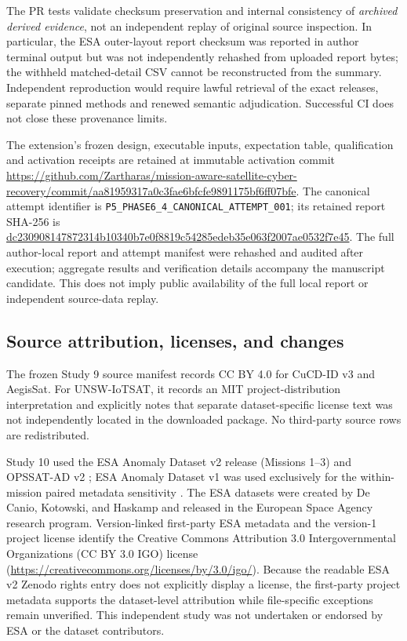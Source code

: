\documentclass[preprint,12pt]{elsarticle}
\begin{document}
The PR tests validate checksum preservation and internal consistency of \emph{archived derived evidence}, not an independent replay of original source inspection. In particular, the ESA outer-layout report checksum was reported in author terminal output but was not independently rehashed from uploaded report bytes; the withheld matched-detail CSV cannot be reconstructed from the summary. Independent reproduction would require lawful retrieval of the exact releases, separate pinned methods and renewed semantic adjudication. Successful CI does not close these provenance limits.

The extension's frozen design, executable inputs, expectation table, qualification and activation receipts are retained at immutable activation commit \url{https://github.com/Zartharas/mission-aware-satellite-cyber-recovery/commit/aa81959317a0c3fae6bfcfe9891175bf6ff07bfe}. The canonical attempt identifier is \texttt{P5\_PHASE6\_4\_CANONICAL\_ATTEMPT\_001}; its retained report SHA-256 is \url{dc230908147872314b10340b7e0f8819c54285edeb35e063f2007ae0532f7e45}. The full author-local report and attempt manifest were rehashed and audited after execution; aggregate results and verification details accompany the manuscript candidate. This does not imply public availability of the full local report or independent source-data replay.

\subsection{Source attribution, licenses, and changes}
The frozen Study 9 source manifest records CC BY 4.0 for CuCD-ID v3 and AegisSat. For UNSW-IoTSAT, it records an MIT project-distribution interpretation and explicitly notes that separate dataset-specific license text was not independently located in the downloaded package. No third-party source rows are redistributed.

Study 10 used the ESA Anomaly Dataset v2 release (Missions 1--3) \cite{esaad2025v2} and OPSSAT-AD v2 \cite{opssat2024v2}; ESA Anomaly Dataset v1 was used exclusively for the within-mission paired metadata sensitivity \cite{esaad2024v1}. The ESA datasets were created by De Canio, Kotowski, and Haskamp and released in the European Space Agency research program. Version-linked first-party ESA metadata and the version-1 project license identify the Creative Commons Attribution 3.0 Intergovernmental Organizations (CC BY 3.0 IGO) license (\url{https://creativecommons.org/licenses/by/3.0/igo/}). Because the readable ESA v2 Zenodo rights entry does not explicitly display a license, the first-party project metadata supports the dataset-level attribution while file-specific exceptions remain unverified. This independent study was not undertaken or endorsed by ESA or the dataset contributors.
\end{document}
